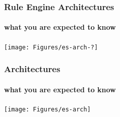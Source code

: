 \documentclass[xcolor={usenames,dvipsnames,svgnames}, compress]{beamer}
\begin{document}


\begin{frame}
  \frametitle{Rule Engine Architectures}
  \framesubtitle{what you are expected to know}
  \begin{center}
    \texttt{[image: Figures/es-arch-?]}
  \end{center}
\end{frame}

\begin{frame}
  \frametitle{Architectures}
  \framesubtitle{what you are expected to know}
  \begin{center}
    \texttt{[image: Figures/es-arch]}
  \end{center}
  
\end{frame}
\end{document}
